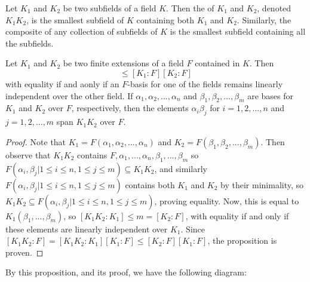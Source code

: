 \documentclass[12pt, a4paper, oneside, openright, titlepage]{book}
\begin{document}
\begin{defn}
    Let $K_1$ and $K_2$ be two subfields of a field $K$. Then the  of $K_1$ and $K_2$, denoted $K_1K_2$, is the smallest subfield of $K$ containing both $K_1$ and $K_2$. Similarly, the composite of any collection of subfields of $K$ is the smallest subfield containing all the subfields.
\end{defn}



\begin{prop}
    Let $K_1$ and $K_2$ be two finite extensions of a field $F$ contained in $K$. Then \begin{equation*}
        [K_1K_2:F]\leq [K_1:F][K_2:F]
    \end{equation*}
    with equality if and aonly if an $F$-basis for one of the fields remains linearly independent over the other field. If $\alpha_1,\alpha_2,...,\alpha_n$ and $\beta_1,\beta_2,...,\beta_m$ are bases for $K_1$ and $K_2$ over $F$, respectively, then the elements $\alpha_i\beta_j$ for $i = 1,2,...,n$ and $j = 1,2,...,m$ span $K_1K_2$ over $F$.
\end{prop}
\begin{proof}
    Note that $K_1=F(\alpha_1,\alpha_2,...,\alpha_n)$ and $K_2 = F(\beta_1,\beta_2,...,\beta_m)$. Then observe that $K_1K_2$ contains $F,\alpha_1,...,\alpha_n,\beta_1,...,\beta_m$ so $F(\alpha_i,\beta_j|1\leq i \leq n,1\leq j \leq m) \subseteq K_1K_2$, and similarly $F(\alpha_i,\beta_j|1\leq i \leq n,1\leq j \leq m)$ contains both $K_1$ and $K_2$ by their minimality, so $K_1K_2 \subseteq F(\alpha_i,\beta_j|1\leq i \leq n,1\leq j \leq m)$, proving equality. Now, this is equal to $K_1(\beta_1,...,\beta_m)$, so $[K_1K_2:K_1]\leq m = [K_2:F]$, with equality if and only if these elements are linearly independent over $K_1$. Since $[K_1K_2:F] = [K_1K_2:K_1][K_1:F] \leq [K_2:F][K_1:F]$, the proposition is proven.
\end{proof}


By this proposition, and its proof, we have the following diagram:
\begin{center}
\end{center}
\end{document}
